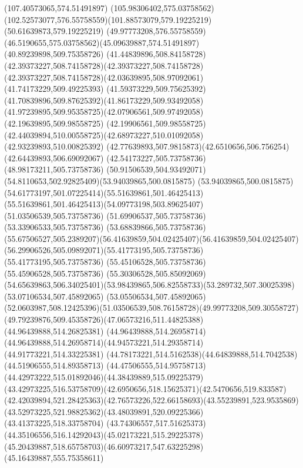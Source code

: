 {{	\lineto(107.40573065,574.51491897)
	\curveto(105.98306402,575.03758562)(102.52573077,576.55758559)(101.88573079,579.19225219)
	\lineto(50.61639873,579.19225219)
	\curveto(49.97773208,576.55758559)(46.5190655,575.03758562)(45.09639887,574.51491897)
	\closepath
	\moveto(40.89239898,509.75358726)
	\curveto(41.44839896,508.84158728)(42.39373227,508.74158728)(42.39373227,508.74158728)
	\curveto(42.39373227,508.74158728)(42.03639895,508.97092061)(41.74173229,509.49225393)
	\curveto(41.59373229,509.75625392)(41.70839896,509.87625392)(41.86173229,509.93492058)
	\curveto(41.97239895,509.95358725)(42.07906561,509.97492058)(42.19639895,509.98558725)
	\lineto(42.19906561,509.98558725)
	\curveto(42.44039894,510.00558725)(42.68973227,510.01092058)(42.93239893,510.00825392)
	\curveto(42.77639893,507.9815873)(42.6510656,506.756254)(42.64439893,506.69092067)
	\lineto(42.54173227,505.73758736)
	\lineto(48.98173211,505.73758736)
	\curveto(50.91506539,504.93492071)(54.8110653,502.92825409)(53.94039865,500.0815875)
	\curveto(53.94039865,500.0815875)(54.61773197,501.07225414)(55.51639861,501.46425413)
	\curveto(55.51639861,501.46425413)(54.09773198,503.89625407)(51.03506539,505.73758736)
	\lineto(51.69906537,505.73758736)
	\lineto(53.33906533,505.73758736)
	\lineto(53.68839866,505.73758736)
	\curveto(55.67506527,505.2389207)(56.41639859,504.02425407)(56.41639859,504.02425407)
	\curveto(56.29906526,505.09892071)(55.41773195,505.73758736)(55.41773195,505.73758736)
	\lineto(55.45106528,505.73758736)
	\lineto(55.45906528,505.73758736)
	\lineto(55.30306528,505.85092069)
	\curveto(54.65639863,506.34025401)(53.98439865,506.82558733)(53.289732,507.30025398)
	\lineto(53.07106534,507.45892065)
	\lineto(53.05506534,507.45892065)
	\curveto(52.0603987,508.12425396)(51.03506539,508.76158728)(49.99773208,509.30558727)
	\curveto(49.79239876,509.45358726)(47.06573216,511.44825388)(44.96439888,514.26825381)
	\lineto(44.96439888,514.26958714)
	\curveto(44.96439888,514.26958714)(44.94573221,514.29358714)(44.91773221,514.33225381)
	\curveto(44.78173221,514.5162538)(44.64839888,514.7042538)(44.51906555,514.89358713)
	\curveto(44.47506555,514.95758713)(44.42973222,515.01892046)(44.38439889,515.09225379)
	\curveto(43.42973225,516.53758709)(42.6950656,518.15625371)(42.5470656,519.833587)
	\curveto(42.42039894,521.28425363)(42.76573226,522.66158693)(43.55239891,523.9535869)
	\curveto(43.52973225,521.98825362)(43.48039891,520.09225366)(43.41373225,518.33758704)
	\curveto(43.74306557,517.51625373)(44.35106556,516.14292043)(45.02173221,515.29225378)
	\curveto(45.20439887,518.65758703)(46.60973217,547.63225298)(45.16439887,555.75358611)
}}
